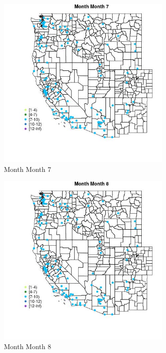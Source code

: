 \begin{figure} 
\centering  
\includegraphics[width=0.77\textwidth]{Code_Outputs/Report_ML_input_PM25_Step4_part_e_de_duplicated_aves_MapObsMo7Month.jpg} 
\caption{\label{fig:Report_ML_input_PM25_Step4_part_e_de_duplicated_avesMapObsMo7Month}Month Month 7} 
\end{figure} 
 

\clearpage 

\begin{figure} 
\centering  
\includegraphics[width=0.77\textwidth]{Code_Outputs/Report_ML_input_PM25_Step4_part_e_de_duplicated_aves_MapObsMo8Month.jpg} 
\caption{\label{fig:Report_ML_input_PM25_Step4_part_e_de_duplicated_avesMapObsMo8Month}Month Month 8} 
\end{figure} 
 

